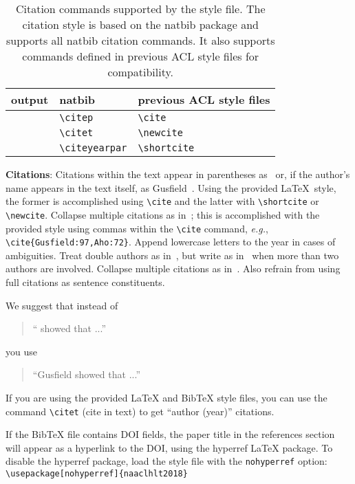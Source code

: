 \begin{table*}[t!]
\centering
\begin{tabular}{lll}
  output & natbib & previous ACL style files\\
  \hline
  \citep{Gusfield:97} & \verb|\citep| & \verb|\cite| \\
  \citet{Gusfield:97} & \verb|\citet| & \verb|\newcite| \\
  \citeyearpar{Gusfield:97} & \verb|\citeyearpar| & \verb|\shortcite| \\
\end{tabular}
\caption{Citation commands supported by the style file.
  The citation style is based on the natbib package and
  supports all natbib citation commands.
  It also supports commands defined in previous ACL style files
  for compatibility.
  }
\end{table*}

{\bf Citations}: Citations within the text appear in parentheses
as~\cite{Gusfield:97} or, if the author's name appears in the text
itself, as Gusfield~.
Using the provided \LaTeX\ style, the former is accomplished using
{\small\verb|\cite|} and the latter with {\small\verb|\shortcite|} or {\small\verb|\newcite|}. Collapse multiple citations as in~\cite{Gusfield:97,Aho:72}; this is accomplished with the provided style using commas within the {\small\verb|\cite|} command, {\em e.g.}, {\small\verb|\cite{Gusfield:97,Aho:72}|}. Append lowercase letters to the year in cases of ambiguities.  
 Treat double authors as
in~\cite{Aho:72}, but write as in~\cite{Chandra:81} when more than two
authors are involved. Collapse multiple citations as
in~\cite{Gusfield:97,Aho:72}. Also refrain from using full citations
as sentence constituents.

We suggest that instead of
\begin{quote}
  ``\cite{Gusfield:97} showed that ...''
\end{quote}
you use
\begin{quote}
``Gusfield    showed that ...''
\end{quote}

If you are using the provided \LaTeX{} and Bib\TeX{} style files, you
can use the command \verb|\citet| (cite in text)
to get ``author (year)'' citations.

If the Bib\TeX{} file contains DOI fields, the paper
title in the references section will appear as a hyperlink
to the DOI, using the hyperref \LaTeX{} package.
To disable the hyperref package, load the style file
with the \verb|nohyperref| option: \\{\small
\verb|\usepackage[nohyperref]{naaclhlt2018}|}


